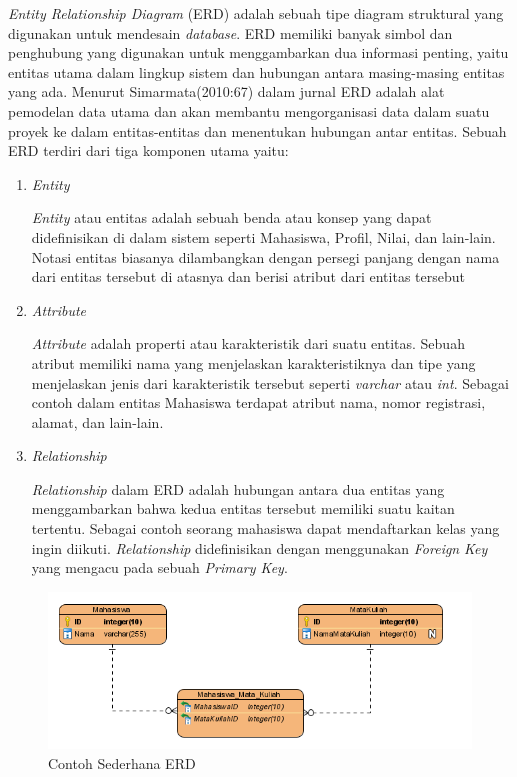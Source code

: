 	\emph{Entity Relationship Diagram} (ERD) adalah sebuah tipe diagram struktural yang digunakan untuk mendesain \textit{database}. ERD memiliki banyak simbol dan penghubung yang digunakan untuk menggambarkan dua informasi penting, yaitu entitas utama dalam lingkup sistem dan hubungan antara masing-masing entitas yang ada. Menurut Simarmata(2010:67) dalam jurnal \cite{Fridayanthie2016} ERD adalah alat pemodelan data utama dan akan membantu mengorganisasi data dalam suatu proyek ke dalam entitas-entitas dan menentukan hubungan antar entitas. Sebuah ERD terdiri dari tiga komponen utama yaitu:

\begin{enumerate}

	\item \textit{Entity}

	\textit{Entity} atau entitas adalah sebuah benda atau konsep yang dapat didefinisikan di dalam sistem seperti Mahasiswa, Profil, Nilai, dan lain-lain. Notasi entitas biasanya dilambangkan dengan persegi panjang dengan nama dari entitas tersebut di atasnya dan berisi atribut dari entitas tersebut 

	\item \textit{Attribute}

	\textit{Attribute} adalah properti atau karakteristik dari suatu entitas. Sebuah atribut memiliki nama yang menjelaskan karakteristiknya dan tipe yang menjelaskan jenis dari karakteristik tersebut seperti \textit{varchar} atau \textit{int}. Sebagai contoh dalam entitas Mahasiswa terdapat atribut nama, nomor registrasi, alamat, dan lain-lain.

	\item \textit{Relationship}

	\textit{Relationship} dalam ERD adalah hubungan antara dua entitas yang menggambarkan bahwa kedua entitas tersebut memiliki suatu kaitan tertentu. Sebagai contoh seorang mahasiswa dapat mendaftarkan kelas yang ingin diikuti. \textit{Relationship} didefinisikan dengan menggunakan \textit{Foreign} \textit{Key} yang mengacu pada sebuah \textit{Primary Key}.
\end{enumerate}


\begin{figure}[H]
	\centering
	\includegraphics[width=1\textwidth]{gambar/contoh_erd}
	\caption{Contoh Sederhana ERD}
\end{figure}

